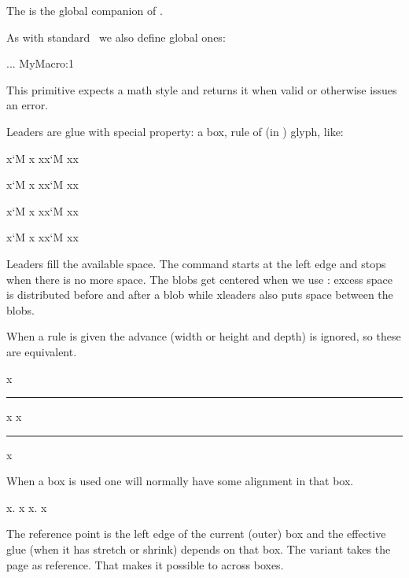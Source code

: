 {\getbuffer}

\stopoldprimitive

\startoldprimitive[title={\prm {gdef}}]

The is the global companion of .

\stopoldprimitive

\startnewprimitive[title={\prm {gdefcsname}}]

As with standard \TEX\ we also define global ones:

\starttyping
\expandafter\gdef\csname MyMacro:1\endcsname{...}
             \gdefcsname MyMacro:1
\stoptyping

\stopnewprimitive

\startnewprimitive[title={\prm {givenmathstyle}}]

This primitive expects a math style and returns it when valid or otherwise issues
an error.

\stopnewprimitive

\startnewprimitive[title={\prm {gleaders}}]

Leaders are glue with special property: a box, rule of (in \LUAMETATEX) glyph, like:

\startlines
x\leaders   \glyph `M \hfill  x
xx\leaders  \glyph `M \hfill xx

x\cleaders  \glyph `M \hfill x
xx\cleaders \glyph `M \hfill xx

x\xleaders  \glyph `M \hfill x
xx\xleaders \glyph `M \hfill xx

x\gleaders  \glyph `M \hfill x
xx\gleaders \glyph `M \hfill xx
\stoplines

Leaders fill the available space. The  command starts at the left
edge and stops when there is no more space. The blobs get centered when we use
: excess space is distributed before and after a blob while \prm
{xleaders} also puts space between the blobs.

When a rule is given the advance (width or height and depth) is ignored, so these
are equivalent.

\starttyping
x\leaders \hrule           \hfill x
x\leaders \hrule width 1cm \hfill x
\stoptyping

When a box is used one will normally have some alignment in that box.

\starttyping
x\leaders \hbox {\hss.\hss} \hfill            x
x\leaders \hbox {\hss.\hss} \hskip 6cm \relax x
\stoptyping

The reference point is the left edge of the current (outer) box and the effective
glue (when it has stretch or shrink) depends on that box. The 
variant takes the page as reference. That makes it possible to 
across boxes.

